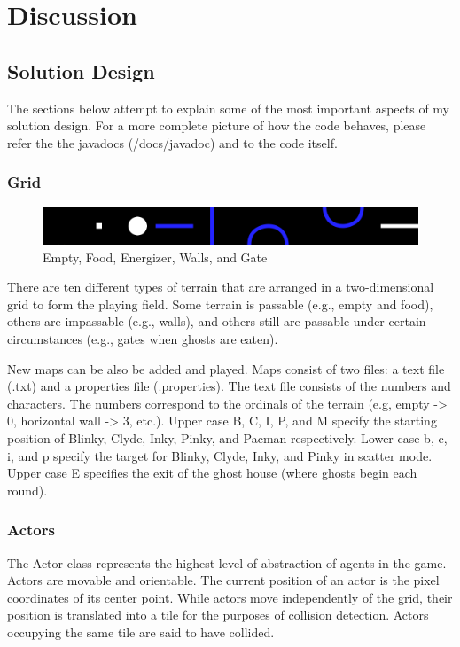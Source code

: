 \documentclass{article}
\begin{document}
\section{Discussion}
\subsection{Solution Design}
The sections below attempt to explain some of the most important aspects of
my solution design. For a more complete picture of how the code behaves, please
refer the the javadocs (/docs/javadoc) and to the code itself.

\subsubsection{Grid}
\begin{figure}[h]
	\centering
	\includegraphics[width=0.75\linewidth]{terrain}
	\caption{Empty, Food, Energizer, Walls, and Gate \label{f:terrain}}
\end{figure}

There are ten different types of terrain that are arranged in a two-dimensional
grid to form the playing field. Some terrain is passable (e.g., empty and food),
others are impassable (e.g., walls), and others still are passable under certain
circumstances (e.g., gates when ghosts are eaten).

New maps can be also be added and played. Maps consist of two files: a text file
(.txt) and a properties file (.properties). The text file consists of the
numbers and characters. The numbers correspond to the ordinals of the terrain
(e.g, empty -> 0, horizontal wall -> 3, etc.). Upper case B, C, I, P, and M
specify the starting position of Blinky, Clyde, Inky, Pinky, and Pacman
respectively. Lower case b, c, i, and p specify the target for Blinky, Clyde,
Inky, and Pinky in scatter mode. Upper case E specifies the exit of the ghost
house (where ghosts begin each round).

\subsubsection{Actors}
The Actor class represents the highest level of abstraction of agents in the
game. Actors are movable and orientable. The current position of an actor is the
pixel coordinates of its center point. While actors move independently of the
grid, their position is translated into a tile for the purposes of collision
detection. Actors occupying the same tile are said to have collided.
\end{document}
